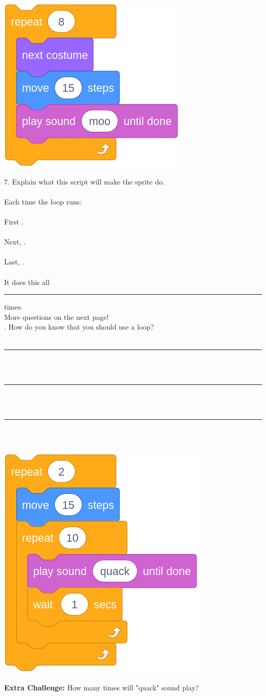 \documentclass[letterpaper,12pt]{article}
\newcommand\numbox{%
    \fbox{\rule{1in}{0pt}\rule[-1ex]{0pt}{5ex}}}
\begin{document}
\begin{center}
\includegraphics[scale=.3]{q7_script0.png}
\end{center}
7. Explain what this script will make the sprite do. \\ \\
Each time the loop runs: \\ \\
\indent First \hrulefill. \\ \\
\indent Next, \hrulefill. \\ \\
\indent Last, \hrulefill. \\ \\
It does this all \rule{1cm}{0.5pt} times. \\

\noindent More questions on the next page! \dotfill \\

. How do you know that you should use a loop? \\ \\
\noindent \rule{18.5cm}{0.5pt} \\ \\
\noindent \rule{18.5cm}{0.5pt} \\ \\
\noindent \rule{18.5cm}{0.5pt} \\

\noindent \dotfill \\
\begin{center}
\includegraphics[scale=.3]{ec_script0.png}
\end{center}

\noindent \textbf{Extra Challenge:} How many times will "quack" sound play? \numbox
\end{document}
